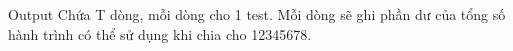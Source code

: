 Output  
Chứa T dòng, mỗi dòng cho 1 test. Mỗi dòng sẽ ghi phần dư của tổng số hành trình có thể sử dụng khi chia cho 12345678.